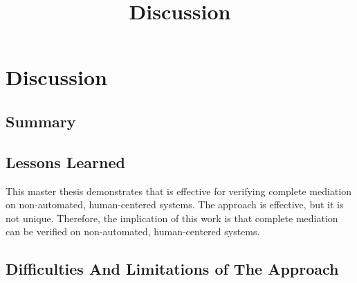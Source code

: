 \documentclass[../../main/main.tex]{subfiles}
\begin{document}
\title{Discussion}

\chapter{Discussion}\label{chp:discussion}

\section{Summary}\label{recap}

\section{Lessons Learned}\label{missionaccomplished}
This master thesis demonstrates that  is effective for verifying complete mediation on non-automated, human-centered systems.  The  approach is effective, but it is not unique.  Therefore, the implication of this work is that complete mediation can be verified on non-automated, human-centered systems. 


\section{Difficulties And Limitations of The Approach}\label{missionaccomplished}
\end{document}
